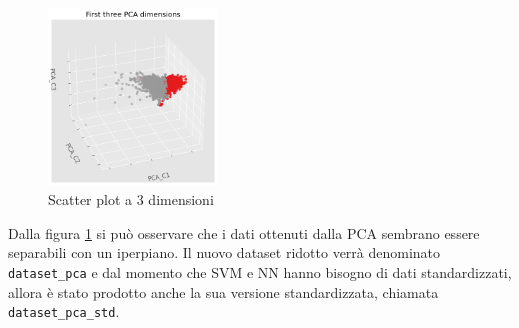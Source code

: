 \begin{figure}[!ht]
      \centering
      \includegraphics[width=0.4\textwidth]{img/analisi/pcaNuovoDataset.png}
      \caption{Scatter plot a 3 dimensioni}
      \label{fig:pca-3d}
\end{figure}

Dalla figura \ref{fig:pca-3d} si può osservare che i dati ottenuti dalla PCA
sembrano essere separabili con un iperpiano. Il nuovo dataset ridotto verrà
denominato \texttt{dataset\_pca} e dal momento che SVM e NN hanno bisogno di dati
standardizzati, allora è stato prodotto anche la sua versione standardizzata,
chiamata \texttt{dataset\_pca\_std}. 




